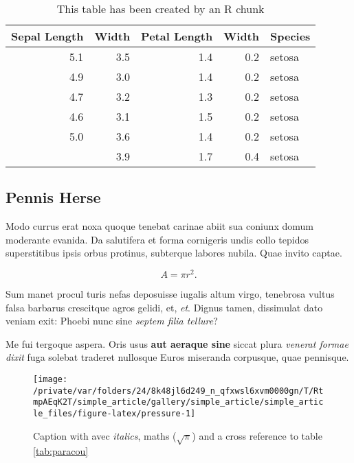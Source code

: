 \documentclass[fleqn,10pt]{article} %
\begin{document}
\scriptsize

\begin{longtable}[t]{rrrrl}
\caption{\label{tab:kable}This table has been created by an R chunk}\\
\toprule
Sepal Length & Width & Petal Length & Width & Species\\
\midrule
5.1 & 3.5 & 1.4 & 0.2 & setosa\\
4.9 & 3.0 & 1.4 & 0.2 & setosa\\
4.7 & 3.2 & 1.3 & 0.2 & setosa\\
4.6 & 3.1 & 1.5 & 0.2 & setosa\\
5.0 & 3.6 & 1.4 & 0.2 & setosa\\
\addlinespace
5.4 & 3.9 & 1.7 & 0.4 & setosa\\
\bottomrule
\end{longtable}

\normalsize

\hypertarget{pennis-herse}{%
\subsection{Pennis Herse}\label{pennis-herse}}

Modo currus erat noxa quoque tenebat carinae abiit sua coniunx domum moderante evanida.
Da salutifera et forma cornigeris undis collo tepidos superstitibus ipsis orbus protinus, subterque labores nubila.
Quae invito captae.

\begin{equation}
  A = \pi r^2.
  \label{eq:disc}
\end{equation}

Sum manet procul turis nefas deposuisse iugalis altum virgo, tenebrosa vultus falsa barbarus crescitque agros gelidi, et, \emph{et}.
Dignus tamen, dissimulat dato veniam exit: Phoebi nunc sine \emph{septem filia tellure}?

Me fui tergoque aspera.
Oris usus \textbf{aut aeraque sine} siccat plura \emph{venerat formae dixit} fuga solebat traderet nullosque Euros miseranda corpusque, quae pennisque.



\scriptsize

\begin{figure}

{\centering \texttt{[image: /private/var/folders/24/8k48jl6d249\_n\_qfxwsl6xvm0000gn/T/RtmpAEqK2T/simple\_article/gallery/simple\_article/simple\_article\_files/figure-latex/pressure-1]} 

}

\caption{Caption with avec \emph{italics}, maths (\(\sqrt\pi\)) and a cross reference to table \ref{tab:paracou}}\label{fig:pressure}
\end{figure}
\end{document}
